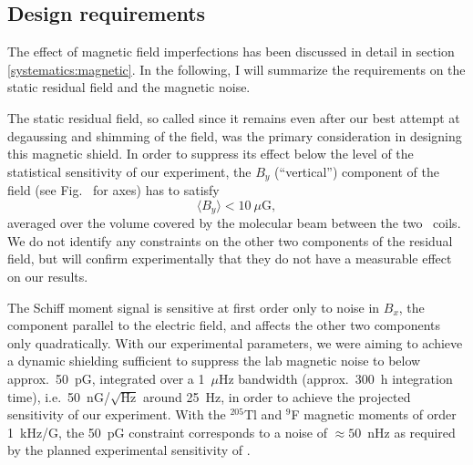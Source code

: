 \subsection{Design requirements}
\label{shield:requirements}

The effect of magnetic field imperfections has been discussed in detail in
section \ref{systematics:magnetic}. In the following, I will summarize the
requirements on the static residual field and the magnetic noise.


The static residual field, so called since it remains even after our best
attempt at degaussing and shimming of the field, was the primary consideration
in designing this magnetic shield. In order to suppress its effect below the
level of the statistical sensitivity of our experiment, the $B_y$ (``vertical'')
component of the field (see Fig.~ for axes) has to satisfy
%
\begin{equation}
   \label{By_criterion}
   \langle B_y\rangle < 10~\mu\mathrm{G},
\end{equation}
%
averaged over the volume covered by the molecular beam between the two \RF\
coils. We do not identify any constraints on the other two components of the
residual field, but will confirm experimentally that they do not have a
measurable effect on our results.

The Schiff moment signal is sensitive at first order only to noise in $B_x$, the
component parallel to the electric field, and affects the other two components
only quadratically. With our experimental parameters, we were aiming to achieve
a dynamic shielding sufficient to suppress the lab magnetic noise to below
approx.\ 50~pG, integrated over a 1~$\mu$Hz bandwidth (approx.\ 300~h
integration time), i.e.\ 50~nG/$\sqrt{\text{Hz}}$ around 25~Hz, in order to
achieve the projected sensitivity of our experiment. With the $^{205}$Tl
and $^9$F magnetic moments of order 1~kHz/G, the 50~pG constraint corresponds to
a noise of $\approx50$~nHz as required by the planned experimental sensitivity
of \CENTREX.

